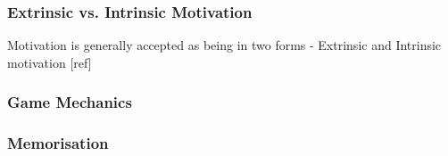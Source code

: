 \subsubsection{Extrinsic vs. Intrinsic Motivation}
Motivation is generally accepted as being in two forms - Extrinsic and Intrinsic motivation  [ref]
\subsubsection{Game Mechanics}
\subsubsection{Memorisation}
